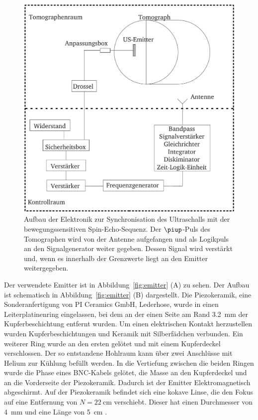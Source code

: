 \documentclass[
    11pt,
    ngerman
]{scrbook}
\begin{document}
\begin{figure}[htbp]
    \centering
    \includegraphics[width=.8\textwidth]{Abbildungen/elektronik.pdf}
    \caption{%
        Aufbau der Elektronik zur Synchronisation des Ultraschalls mit der bewegungssensitiven Spin-Echo-Sequenz. Der $\piup$-Puls des Tomographen wird von der Antenne aufgefangen und als Logikpuls an den Signalgenerator weiter gegeben. Dessen Signal wird verstärkt und, wenn es innerhalb der Grenzwerte liegt an den Emitter weitergegeben.
    }
    \label{fig:elektronik}
\end{figure}

Der verwendete Emitter ist in Abbildung~\ref{fig:emitter} (A) zu sehen. Der Aufbau ist schematisch in Abbildung~\ref{fig:emitter} (B) dargestellt. Die Piezokeramik, eine Sonderanfertigung von PI Ceramics GmbH, Lederhose, wurde in einen Leiterplatinenring eingelassen, bei dem an der einen Seite am Rand \SI{3.2}{\milli\meter} der Kupferbeschichtung entfernt wurden. Um einen elektrischen Kontakt herzustellen wurden Kupferbeschichtungen und Keramik mit Silberfädchen verbunden. Ein weiterer Ring wurde an den ersten gelötet und mit einem Kupferdeckel verschlossen. Der so entstandene Hohlraum kann über zwei Anschlüsse mit Helium zur Kühlung befüllt werden. In die Vertiefung zwischen die beiden Ringen wurde die Phase eines BNC-Kabels gelötet, die Masse an den Kupferdeckel und an die Vorderseite der Piezokeramik. Dadurch ist der Emitter Elektromagnetisch abgeschirmt. Auf der Piezokeramik befindet sich eine kokave Linse, die den Fokus auf eine Entfernung von $N = \SI{22}{\centi\meter}$ verschiebt. Dieser hat einen Durchmesser von \SI{4}{\milli\meter} und eine Länge von \SI{5}{\centi\meter} \parencite{diss_radicke}.
\end{document}
